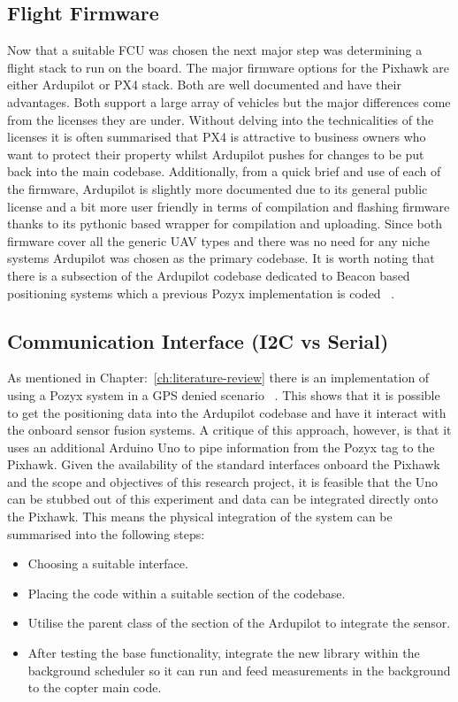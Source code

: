 \subsection{Flight Firmware}\label{subsec:flight-firmware}
Now that a suitable FCU was chosen the next major step was determining a flight stack to run on the board.
The major firmware options for the Pixhawk are either Ardupilot or PX4 stack.
Both are well documented and have their advantages.
Both support a large array of vehicles but the major differences come from the licenses they are under.
Without delving into the technicalities of the licenses it is often summarised that PX4 is attractive to business owners who want to protect their property whilst Ardupilot pushes for changes to be put back into the main codebase.
Additionally, from a quick brief and use of each of the firmware, Ardupilot is slightly more documented due to its general public license and a bit more user friendly in terms of compilation and flashing firmware thanks to its pythonic based wrapper for compilation and uploading.
Since both firmware cover all the generic UAV types and there was no need for any niche systems Ardupilot was chosen as the primary codebase.
It is worth noting that there is a subsection of the Ardupilot codebase dedicated to Beacon based positioning systems which a previous Pozyx implementation is coded ~\citep{ardupilotarduino}.

\subsection{Communication Interface (I2C vs Serial)}\label{subsec:communication-interfacei2c-vs-serial}
As mentioned in Chapter:~\ref{ch:literature-review} there is an implementation of using a Pozyx system in a GPS denied scenario ~\cite{ardupilotarduino}.
This shows that it is possible to get the positioning data into the Ardupilot codebase and have it interact with the onboard sensor fusion systems.
A critique of this approach, however, is that it uses an additional Arduino Uno to pipe information from the Pozyx tag to the Pixhawk.
Given the availability of the standard interfaces onboard the Pixhawk and the scope and objectives of this research project, it is feasible that the Uno can be stubbed out of this experiment and data can be integrated directly onto the Pixhawk.
This means the physical integration of the system can be summarised into the following steps:
\begin{itemize}
    \item Choosing a suitable interface.
    \item Placing the code within a suitable section of the codebase.
    \item Utilise the parent class of the section of the Ardupilot to integrate the sensor.
    \item After testing the base functionality, integrate the new library within the background scheduler so it can run and feed measurements in the background to the copter main code.
\end{itemize}

